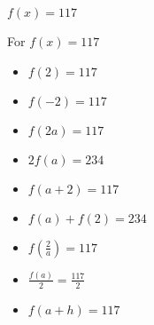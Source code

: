 {$f(x) = 117$}
{For $f(x) = 117$

\begin{itemize}
\item  $f(2) = 117$
\item  $f(-2) = 117$
\item  $f(2a) = 117$
\item  $2 f(a) = 234$
\item $f(a+2) = 117$
\item $f(a) + f(2) = 234$
\item  $f \left( \frac{2}{a} \right) = 117$ 
\item $\frac{f(a)}{2} = \frac{117}{2}$
\item  $f(a + h) = 117$
\end{itemize}
}